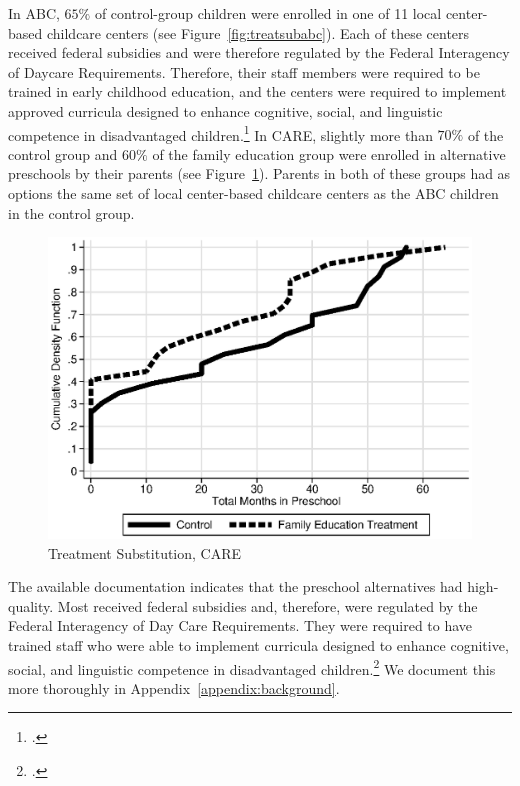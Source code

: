 \noindent In ABC, $65\%$ of control-group children were enrolled in one of 11 local center-based childcare centers (see Figure~\ref{fig:treatsubabc}). Each of these centers received federal subsidies and were therefore regulated by the Federal Interagency of Daycare Requirements. Therefore, their staff members were required to be trained in early childhood education, and the centers were required to implement approved curricula designed to enhance cognitive, social, and linguistic competence in disadvantaged children.\footnote{\citet{Burchinal_etal_1989_CD_Daycare-Pre-K-Dev}.} In CARE, slightly more than $70\%$ of the control group and $60\%$ of the family education group were enrolled in alternative preschools by their parents (see Figure~\ref{fig:treatsubcare}). Parents in both of these groups had as options the same set of local center-based childcare centers as the ABC children in the control group.

\begin{figure}[H]
		\caption{Treatment Substitution, CARE} \label{fig:treatsubcare}
		\includegraphics[width=.9\columnwidth]{output/care_controlcontamination_months.eps}
\end{figure}

\noindent The available documentation indicates that the preschool alternatives had high-quality. Most received federal subsidies and, therefore, were regulated by the Federal Interagency of Day Care Requirements. They were required to have trained staff who were able to implement curricula designed to enhance cognitive, social, and linguistic competence in disadvantaged children.\footnote{\citet{Burchinal_etal_1989_CD_Daycare-Pre-K-Dev}.} We document this more thoroughly in Appendix~\ref{appendix:background}.

